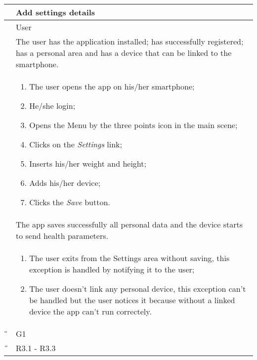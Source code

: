 \begin{center}
	\begin{longtable}{ | p{} | p{} | }
		\hline
		 \A &   Add settings details\\ 

		\hline
		 \B &  User \\ 

		\hline
  		 \C &  The user has the application installed; has successfully registered; has a personal area and has a device that can be linked to the smartphone.\\ 

		\hline
		\D & \begin{enumerate}
			\item The user opens the app on his/her smartphone;
			\item He/she login;
			\item Opens the Menu by the three points icon in the main scene;
			\item Clicks on the \textit{Settings} link;
			\item Inserts his/her weight and height;
			\item Adds his/her device;
			\item Clicks the \textit{Save} button.
		\end{enumerate} \\

		\hline
		\E & The app saves successfully all personal data and the device starts to send health parameters.\\

		\hline
		\F & \begin{enumerate}
			\item The user exits from the Settings area without saving, this exception is handled by notifying it to the user;
			\item The user doesn't link any personal device, this exception can't be handled but the user notices it because 					without a linked device the app can't run correctely.
		\end{enumerate} \\
		
		\hline
		\G & G1\\

		\hline
		\H & R3.1 - R3.3 \\
		\hline

	\end{longtable}
\end{center}